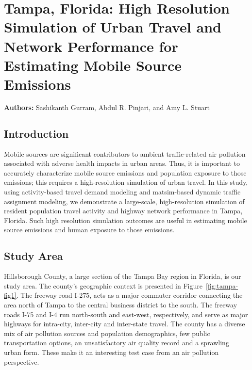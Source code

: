 \chapter{Tampa, Florida: High Resolution Simulation of Urban Travel and Network Performance for Estimating Mobile Source Emissions}
\label{ch:tampa}
\hfill \textbf{Authors:} Sashikanth Gurram, Abdul R. Pinjari, and Amy L. Stuart

\section{Introduction}
Mobile sources are significant contributors to ambient traffic-related air pollution associated with adverse health impacts in urban areas. Thus, it is important to accurately characterize mobile source emissions and population exposure to those emissions; this requires a high-resolution simulation of urban travel. In this study, using activity-based travel demand modeling and \gls{matsim}-based dynamic traffic assignment modeling, we demonstrate a large-scale, high-resolution simulation of resident population travel activity and highway network performance in Tampa, Florida. Such high resolution simulation outcomes are useful in estimating mobile source emissions and human exposure to those emissions. 

\section{Study Area}
Hillsborough County, a large section of the Tampa Bay region in Florida, is our study area. The county's geographic context is presented in Figure~\ref{fig:tampa-fig1}. The freeway road I-275, acts as a major commuter corridor connecting the area north of Tampa to the central business district to the south. The freeway roads I-75 and I-4 run north-south and east-west, respectively, and serve as major highways for intra-city, inter-city and inter-state travel. The county has a diverse mix of air pollution sources and population demographics, few public transportation options, an unsatisfactory air quality record and a sprawling urban form. These make it an interesting test case from an air pollution perspective.

